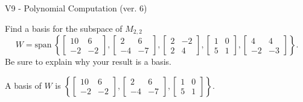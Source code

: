 \begin{exercise}
  \begin{exerciseTitle}V9 - Polynomial Computation (ver. 6)\end{exerciseTitle}
  \begin{exerciseStatement}
    Find a basis for the subspace of \(M_{2,2}\) 
\[W=\mathrm{span}\ \left\{\left[\begin{array}{cc}
10 & 6 \\
-2 & -2
\end{array}\right] , \left[\begin{array}{cc}
2 & 6 \\
-4 & -7
\end{array}\right] , \left[\begin{array}{cc}
2 & -2 \\
2 & 4
\end{array}\right] , \left[\begin{array}{cc}
1 & 0 \\
5 & 1
\end{array}\right] , \left[\begin{array}{cc}
4 & 4 \\
-2 & -3
\end{array}\right]\right\}.\]
 Be sure to explain why your result is a basis.


  \end{exerciseStatement}
  \begin{exerciseAnswer}
   A basis of \(W\) is  \(\left\{\left[\begin{array}{cc}
10 & 6 \\
-2 & -2
\end{array}\right] , \left[\begin{array}{cc}
2 & 6 \\
-4 & -7
\end{array}\right] , \left[\begin{array}{cc}
1 & 0 \\
5 & 1
\end{array}\right]\right\}\).
  


  \end{exerciseAnswer}
\end{exercise}